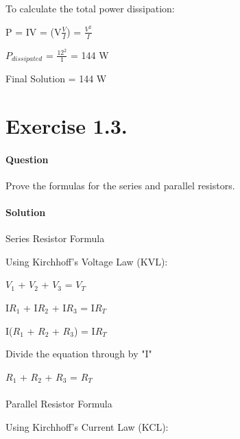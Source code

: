 \documentclass[a4paper, 12pt]{article}
\begin{document}
To calculate the total power dissipation:\newline

P = IV = (V$\frac{V}{I}$) = $\frac{V^2}{I}$\newline

$P_{dissipated}$ = $\frac{12^2}{1}$ = 144 W\newline

Final Solution = 144 W\newline

\clearpage

\section{Exercise 1.3.}

\paragraph{Question\newline}

Prove the formulas for the series and parallel resistors.

\paragraph{Solution\newline}

Series Resistor Formula

Using Kirchhoff's Voltage Law (KVL):\newline

$V_1$ + $V_2$ + $V_3$ = $V_T$\newline

I$R_1$ + I$R_2$ + I$R_3$ = I$R_T$\newline

I($R_1$ + $R_2$ + $R_3$) = I$R_T$\newline

Divide the equation through by "I"\newline

$R_1$ + $R_2$ + $R_3$ = $R_T$\newline

\paragraph{\newline}

Parallel Resistor Formula

Using Kirchhoff's Current Law (KCL):\newline
\end{document}
